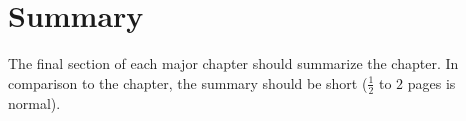 \section{Summary}

\label{s:Contribution-1-Summary}

The final section of each major chapter should summarize the chapter. In comparison to the chapter, the summary should be short ($\frac{1}{2}$ to $2$ pages is normal).